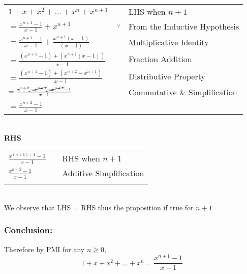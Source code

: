 \documentclass{article}
\begin{document}
\begin{table}[htp]
    \centering
    \begin{tabular}{lcl}
        $1+x+x^2+\dots+x^n+x^{n+1}$ &  & LHS when $n+1$\\
        $=\frac{x^{n+1}-1}{x-1} + x^{n+1}$ & $\because$ & From the Inductive Hypothesis\\
        $=\frac{x^{n+1}-1}{x-1} + \frac{x^{n+1}(x-1)}{(x-1)}$ &  & Multiplicative Identity\\
        $=\frac{(x^{n+1}-1)+ (x^{n+1}(x-1))}{x-1}$ &  & Fraction Addition\\
        $=\frac{(x^{n+1}-1)+ (x^{n+2}-x^{n+1})}{x-1}$&&Distributive Property\\
        $=\frac{x^{n+2}\cancel{-x^{n+1}}\cancel{+x^{n+1}}-1}{x-1}$&&Commutative \& Simplification\\
        $=\frac{x^{n+2}-1}{x-1}$&&
    \end{tabular}
\end{table}
 \\
 \textbf{RHS}
 
 \begin{table}[htp]
     \centering
     \begin{tabular}{lcl}
         $\frac{x^{(n+1)+1}-1}{x-1}$ &  & RHS when $n+1$\\
         $\frac{x^{n+2}-1}{x-1}$ &  & Additive Simplification\\
          &  & \\
     \end{tabular}
 \end{table}
  \\
  We observe that LHS = RHS thus the proposition if true for $n+1$
\subsubsection*{\textbf{Conclusion:}}
Therefore by PMI for any $n\geq 0$, $$1+x+x^2+\dots+x^n = \frac{x^{n+1}-1}{x-1}$$
\end{document}
